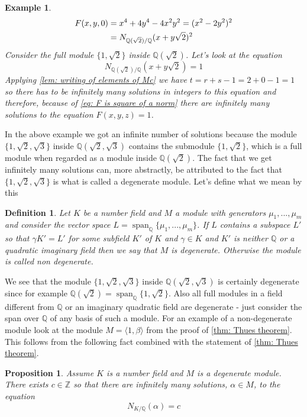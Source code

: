 \documentclass{article}
\newcommand{\Span}{\operatorname{span}}
\newtheorem{definition}{Definition}[section]
\newtheorem{proposition}{Proposition}[section]
\newtheorem{example}{Example}[section]
\newcommand{\mbb}[1]{\mathbb{#1}}
\numberwithin{equation}{section}
\begin{document}
\begin{example}
    \begin{align}\label{eq: F is square of a norm}
        F(x,y,0) & = x^4 + 4y^4 - 4x^2y^2 = (x^2 - 2y^2)^2                \\
                 & = N_{\mbb Q(\sqrt 2) / \mbb Q}(x + y \sqrt 2)^2 \notag
    \end{align}
    Consider the full module $\{1, \sqrt 2\}$ inside $\mbb Q(\sqrt 2)$. Let's look at the equation
    $$N_{\mbb Q(\sqrt 2) / \mbb Q}(x + y \sqrt 2) = 1$$
    Applying \cref{lem: writing of elements of Mc} we have $t = r+s -1 =  2 + 0 - 1 = 1$ so there has to be infinitely many solutions in integers to this equation and therefore, because of \cref{eq: F is square of a norm} there are infinitely many solutions to the equation $F(x, y, z) = 1$.
\end{example}
In the above example we got an infinite number of solutions because the module $\{1, \sqrt 2, \sqrt 3 \}$ inside $\mbb Q(\sqrt 2, \sqrt 3)$ contains the submodule $\{1, \sqrt 2\}$, which is a full module when regarded as a module inside $\mbb Q(\sqrt 2)$. The fact that we get infinitely many solutions can, more abstractly, be attributed to the fact that $\{1, \sqrt 2, \sqrt 3 \}$ is what is called a degenerate module. Let's define what we mean by this
\begin{definition}\label{def: Degenerate module}
    Let $K$ be a number field and $M$ a module with generators $\mu_1, ..., \mu_m$ and consider the vector space $L = \Span_{\mbb Q}\{\mu_1, ..., \mu_m \}$. If $L$ contains a subspace $L'$ so that $\gamma K' = L'$ for some subfield $K'$ of $K$ and $\gamma \in K$ and $K'$ is neither $\mbb Q$ or a quadratic imaginary field then we say that $M$ is degenerate. Otherwise the module is called non degenerate.
\end{definition}
We see that the module $\{1, \sqrt 2, \sqrt 3 \}$ inside $\mbb Q(\sqrt 2, \sqrt 3)$ is certainly degenerate since for example $\mbb Q(\sqrt 2) = \Span_{\mbb Q} \{1, \sqrt 2 \}$. Also all full modules in a field different from $\mbb Q$ or an imaginary quadratic field are degenerate - just consider the span over $\mbb Q$ of any basis of such a module. For an example of a non-degenerate module look at the module $M = \langle 1, \beta \rangle$ from the proof of \cref{thm: Thues theorem}. This follows from the following fact combined with the statement of \cref{thm: Thues theorem}.
\begin{proposition}
    Assume $K$ is a number field and $M$ is a degenerate module. There exists $c \in \mbb Z$ so that there are infinitely many solutions, $\alpha \in M$, to the equation
    $$N_{K / \mbb Q}(\alpha) = c$$
\end{proposition}
\end{document}

